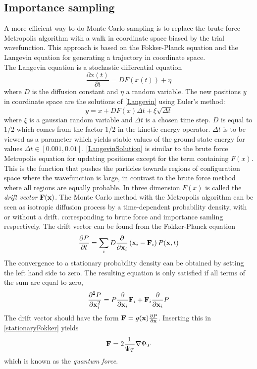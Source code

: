 \documentclass[english, a4paper]{article}
\begin{document}
\subsection{Importance sampling}

A more efficient way to do Monte Carlo sampling is to replace the brute force Metropolis algorithm
with a walk in coordinate space biased by the trial wavefunction. This approach is based on the 
Fokker-Planck equation and the Langevin equation for generating a trajectory in coordinate space. \\

\noindent The Langevin equation is a stochastic differential equation
\begin{equation}
 \frac{\partial x(t)}{\partial t} = D F(x(t)) + \eta
 \label{Langevin}
\end{equation}
where $D$ is the diffusion constant and $\eta$ a random variable.
The new positions $y$ in coordinate space are the solutions of \eqref{Langevin} using Euler's method:
\begin{equation}
 y = x + DF(x)\Delta t + \xi \sqrt{\Delta t}
 \label{LangevinSolution}
\end{equation}
where $\xi$ is a gaussian random variable and $\Delta t$ is a chosen time step. $D$ is equal to $1/2$
which comes from the factor $1/2$ in the kinetic energy operator. $\Delta t$ is to be viewed as a
parameter which yields stable values of the ground state energy for values $\Delta t \in [0.001, 0.01]$.
\eqref{LangevinSolution} is similar to the brute force Metropolis equation for updating positions except for the
term  containing $F(x)$. This is the function that pushes the particles towards regions of configuration space
where the wavefunction is large, in contrast to the brute force method where all regions are equally probable. 
In three dimension $F(x)$ is called the \textit{drift vector} ${\bf F}({\bf x})$.
The Monte Carlo method with the Metropolis algorithm can be seen as isotropic diffusion process by a time-dependent 
probability density, with or without a drift. corresponding to brute force and importance samling respectively.
The drift vector can be found from the
Fokker-Planck equation
\begin{equation}
 \frac{\partial P}{\partial t} = \sum_i D \frac{\partial}{\partial {\bf x}_i}
 \left( {\bf x}_i - {\bf F}_i \right) P({\bf x}, t)
\end{equation}
The convergence to a stationary probability density can be obtained by setting the left hand side to zero. 
The resulting equation is only satisfied if all terms of the sum are equal to zero, 
\begin{equation}
 \frac{\partial^2 P}{\partial {\bf x}_i^2} = P \frac{\partial}{\partial {\bf x}_i} {\bf F}_i
 + {\bf F}_i \frac{\partial}{\partial {\bf x}_i} P
 \label{stationaryFokker}
\end{equation}
The drift vector should have the form ${\bf F} = g({\bf x}) \frac{\partial P}{\partial {\bf x}}$. Inserting this in
\eqref{stationaryFokker} yields 
\begin{equation}
 {\bf F} = 2 \frac{1}{\Psi_T} \nabla \Psi_T
\end{equation}
which is known as the \textit{quantum force}. \\
\end{document}

